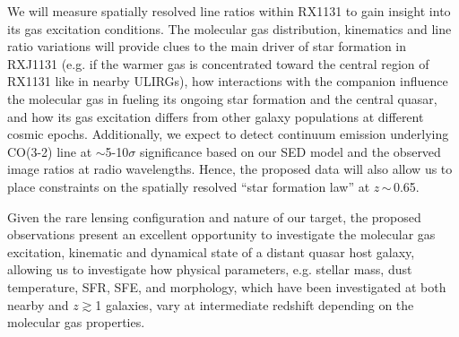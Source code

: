 \documentclass[11pt,a4paper,twoside,graphicx,color]{article}
\newcommand{\bco}{\mbox{CO(2-1)}\xspace}
\newcommand{\cco}{\mbox{CO(3-2)}\xspace}
\newcommand{\ssim}{\,$\sim$\,}
\newcommand{\SF}{star formation\xspace}
\newcommand{\galpop}{galaxy populations\xspace}
\newcommand{\atinterz}{at intermediate redshift\xspace}
\begin{document}
%
We will measure spatially resolved line ratios %
within RX1131 to gain insight into its gas excitation conditions.
The molecular gas distribution, kinematics and line ratio variations will provide clues to
the main driver of \SF in RXJ1131 (e.g. if the warmer gas is
concentrated toward the central region of RX1131 like in nearby ULIRGs),
how interactions with the companion influence the molecular gas
in fueling its ongoing \SF and the central quasar,
and how its gas excitation differs from other \galpop at different cosmic epochs.
%
%
Additionally, we expect to detect continuum emission underlying \cco line at $\sim$5-10$\sigma$ significance
based on our SED model and the observed image ratios at radio wavelengths.
Hence, the proposed data will also allow us to place constraints on the spatially resolved
``\SF law'' at $z$\ssim0.65.

Given the rare lensing configuration and nature of our target, the proposed observations
present an excellent opportunity to investigate the molecular gas excitation, kinematic and dynamical
state of a distant quasar host galaxy, allowing
us to investigate how physical parameters, e.g. stellar mass, dust temperature, SFR, SFE, and morphology, which have been investigated at both nearby and $z$$\gtrsim$1 galaxies, vary \atinterz depending on the molecular gas
properties. %

\end{document}
